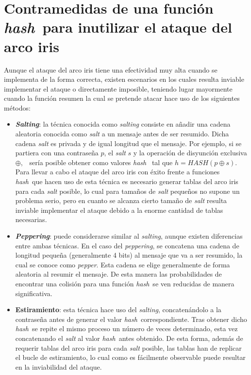 \documentclass[12pt,spanish,listoffigures,listoftables,listofalgorithms]{tfgetsinf}
\newcommand{\hash}{\textit{hash}}
\begin{document}
\section{Contramedidas de una función \hash~para inutilizar el ataque del arco iris} \label{salt}

Aunque el ataque del arco iris tiene una efectividad muy alta cuando se implementa de la forma correcta, existen escenarios en los cuales resulta inviable implementar el ataque o directamente imposible, teniendo lugar mayormente cuando la función resumen la cual se pretende atacar hace uso de los siguientes métodos:

\begin{itemize}

	\item \textbf{\textit{Salting}}: la técnica conocida como \textit{salting} consiste en añadir una cadena aleatoria conocida como \textit{salt} a un mensaje antes de ser resumido. Dicha cadena \textit{salt} es privada y de igual longitud que el mensaje. Por ejemplo, si se partiera con una contraseña $p$, el \textit{salt} $s$ y la operación de disyunción exclusiva $\oplus$,~~sería posible obtener como valores \hash~ tal que $h = HASH(p \oplus s)$. Para llevar a cabo el ataque del arco iris con éxito frente a funciones \hash~que hacen uso de esta técnica es necesario generar tablas del arco iris para cada \textit{salt} posible, lo cual para tamaños de \textit{salt} pequeños no supone un problema serio, pero en cuanto se alcanza cierto tamaño de \textit{salt} resulta inviable implementar el ataque debido a la enorme cantidad de tablas necesarias.

	\item \textbf{\textit{Peppering}}: puede considerarse similar al \textit{salting}, aunque existen diferencias entre ambas técnicas. En el caso del \textit{peppering}, se concatena una cadena de longitud pequeña (generalmente 4 bits) al mensaje que va a ser resumido, la cual se conoce como \textit{pepper}. Esta cadena se elige generalmente de forma aleatoria al resumir el mensaje. De esta manera las probabilidades de encontrar una colisión para una función \hash~se ven reducidas de manera significativa.
    
    \item \textbf{Estiramiento}: esta técnica hace uso del \textit{salting}, concatenándolo a la contraseña antes de generar el valor \hash~correspondiente. Tras obtener dicho \hash~se repite el mismo proceso un número de veces determinado, esta vez concatenando el \textit{salt} al valor \hash~antes obtenido. De esta forma, además de requerir tablas del arco iris para cada \textit{salt} posible, las tablas han de replicar el bucle de estiramiento, lo cual como es fácilmente observable puede resultar en la inviabilidad del ataque.
    
\end{itemize}
\end{document}
